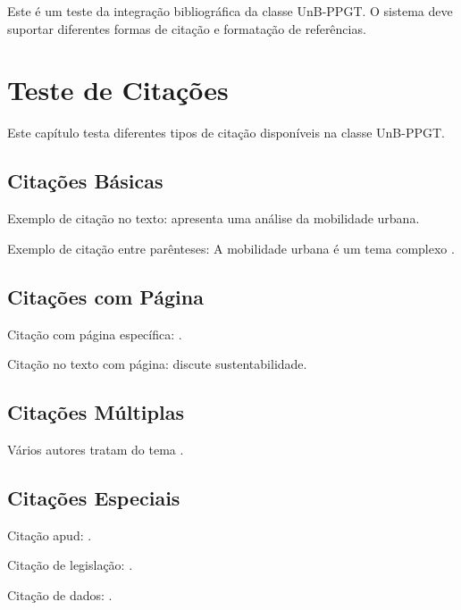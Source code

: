 \documentclass[mestrado,natbib]{UnB-PPGT}
\begin{document}
\pretextual

\begin{resumo}
Este é um teste da integração bibliográfica da classe UnB-PPGT. O sistema deve suportar diferentes formas de citação e formatação de referências.
\end{resumo}

\textual

\chapter{Teste de Citações}

Este capítulo testa diferentes tipos de citação disponíveis na classe UnB-PPGT.

\section{Citações Básicas}

Exemplo de citação no texto:  apresenta uma análise da mobilidade urbana.

Exemplo de citação entre parênteses: A mobilidade urbana é um tema complexo \cite{vasconcellos2012}.

\section{Citações com Página}

Citação com página específica: .

Citação no texto com página:  discute sustentabilidade.

\section{Citações Múltiplas}

Vários autores tratam do tema \cite{vasconcellos2012,silva2019,oliveira2021}.

\section{Citações Especiais}

Citação apud: .

Citação de legislação: .

Citação de dados: .

\postextual


\end{document}
